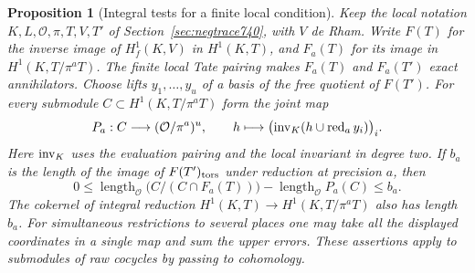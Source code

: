 \documentclass[a4paper,11pt]{article}
\newtheorem{proposition}{Proposition}[section]
\theoremstyle{definition}
\theoremstyle{remark}
\numberwithin{equation}{section}
\begin{document}
\begin{proposition}[Integral tests for a finite local condition]
\leavevmode\label{prop:freetests741}
Keep the local notation \(K,L,\mathcal O,\pi,T,V,T'\) of
Section~\ref{sec:negtrace740}, with \(V\) de Rham. Write
\(F(T)\) for the inverse image of \(H_f^1(K,V)\) in \(H^1(K,T)\),
and \(F_a(T)\) for its image in \(H^1(K,T/\pi^a T)\).
The finite local Tate pairing makes \(F_a(T)\) and \(F_a(T')\)
exact annihilators. Choose lifts \(y_1,\ldots,y_u\) of a basis
of the free quotient of \(F(T')\). For every submodule
\(C\subset H^1(K,T/\pi^a T)\) form the joint map
\[
 P_a:C\longrightarrow(\mathcal O/\pi^a)^u,\qquad
 h\longmapsto
       \bigl({\rm inv}_K(h\mathbin{\cup}\operatorname{red}_a y_i)\bigr)_i .
\]
Here \({\rm inv}_K\) uses the evaluation pairing and the local
invariant in degree two. If \(b_a\) is the length of the image
of \(F(T')_{\rm tors}\) under reduction at precision \(a\), then
\[
  0\le
     \operatorname{length}_{\mathcal O}\bigl(C/(C\cap F_a(T))\bigr)
          -\operatorname{length}_{\mathcal O}P_a(C)
      \le b_a .
 \tag{8}\label{eq:freetests741}
\]
The cokernel of integral reduction
\(H^1(K,T)\to H^1(K,T/\pi^a T)\) also has length \(b_a\).
For simultaneous restrictions to several places one may take
all the displayed coordinates in a single map and sum the upper
errors. These assertions apply to submodules of raw cocycles by
passing to cohomology.
\end{proposition}
\end{document}
